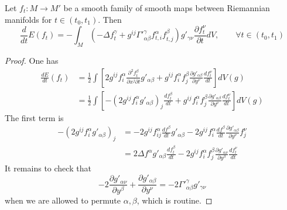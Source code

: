 \begin{lemma}
\label{lem:var-energy}
Let \(f_t: M \longrightarrow M'\) be a smooth family of smooth maps between Riemannian
manifolds for \(t\in (t_0,t_1)\). Then
\[
\frac{d}{dt}E(f_t) = -\int_M \left(-\Delta f_t^\gamma +g^{ij}\Gamma'^{\gamma}_{\alpha\beta}
f^{\alpha}_{t,i}f^{\beta}_{t,j}\right) g'_{\gamma\nu} \frac{\partial f_t^\nu}{\partial
t}dV,\qquad \forall t\in (t_0,t_1)
\]
\end{lemma}
\begin{proof}
One has 
\begin{align*}
   \frac{dE}{dt}(f_t) &= \frac{1}{2}\int \left[ 2g^{ij}  f^\alpha_i \frac{\partial^2 f_t^\beta}{\partial x^j
\partial t} g'_{\alpha\beta}   + g^{ij}f^\alpha_i f^\beta_j \frac{\partial g'_{\alpha\beta}}{\partial y^\nu} \frac{d f^\nu_t}{d t}  \right] dV(g) \\
	 &=\frac{1}{2}\int \left[ -\left(2g^{ij}  f^\alpha_i g'_{\alpha\beta}\right)_j \frac{d f_t^\beta}{
d t}   + g^{ij}f^\alpha_i f^\beta_j \frac{\partial g'_{\alpha\beta}}{\partial y^\nu} \frac{d f^\nu_t}{d t} \right] dV(g)
\end{align*}
The first term is
\begin{align*}
   -\left(2g^{ij}  f^\alpha_i g'_{\alpha\beta}\right)_j &= -2 g^{ij}f^\alpha_{ij}
\frac{d f^\beta}{d t}g'_{\alpha\beta} - 2 g^{ij}f^\alpha_i
\frac{d f^\beta}{d t}\frac{\partial g'_{\alpha\beta}}{\partial y^\nu} f^\nu_j\\
&= 2\Delta f^\alpha g'_{\alpha\beta} \frac{d f_t^\beta}{d t} - 2 g^{ij}f^\alpha_i f^\beta_j \frac{\partial g'_{\alpha\nu}}{\partial y^\beta} \frac{d f_t^\nu}{dt}
\end{align*}
It remains to check that 
\[
-2\frac{\partial g'_{\alpha\nu}}{\partial y^\beta} + \frac{\partial
g'_{\alpha\beta}}{\partial y^\nu} = -2 \Gamma'^\gamma_{\alpha\beta}g'_{\gamma\nu}
\]
when we are allowed to permute \(\alpha,\beta\), which is routine.
\end{proof}

